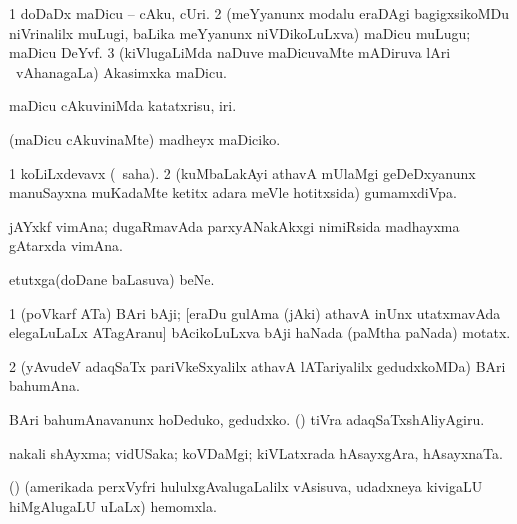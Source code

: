 \bentry
{}
\gl{\nA}
\bmng
\bnum
\num{1} doDaDx maDicu -- cAku, cUri.   
\num{2} (meYyanunx modalu eraDAgi bagigxsikoMDu niVrinalilx muLugi, baLika meYyanunx niVDikoLuLxva) maDicu muLugu; maDicu DeYvf. 
\num{3} (kiVlugaLiMda naDuve maDicuvaMte mADiruva lAri \mo\ vAhanagaLa) Akasimxka maDicu. 
\enum
\emng
\eentry

\bentry
{}
\gl{\sakirx}
\bmng
maDicu cAkuviniMda katatxrisu, iri. 
\emng

\noindent
\gl{\akirx}
\bmng
(maDicu cAkuvinaMte) madheyx maDiciko. 
\emng
\eentry

\bentry
{}
\gl{\nA}
\bmng
\bnum
\num{1} koLiLxdevavx (\rUpa\ saha). 
\num{2} (kuMbaLakAyi athavA mUlaMgi geDeDxyanunx manuSayxna muKadaMte ketitx adara meVle hotitxsida) gumamxdiVpa.   
\enum
\emng
\eentry

\bentry
{}
\gl{\nA}
\bmng
jAYxkf vimAna; dugaRmavAda parxyANakAkxgi nimiRsida madhayxma gAtarxda vimAna. 
\emng
\eentry

\bentry
{}
\gl{\nA}
\bmng
etutxga(doDane baLasuva) beNe. 
\emng
\eentry

\bentry
{}
\gl{\nA}
\bmng
\bnum
\num{1} (poVkarf ATa) BAri bAji; [eraDu gulAma (jAki) athavA inUnx utatxmavAda elegaLuLaLx ATagAranu] bAcikoLuLxva bAji haNada (paMtha paNada) motatx. 
\num{2} (yAvudeV adaqSaTx pariVkeSxyalilx athavA lATariyalilx gedudxkoMDa) BAri bahumAna. 
\enum
\emng

\noindent
\gl{\pagu}
\bmng
{} 
\banum
{} BAri bahumAnavanunx hoDeduko, gedudxko. 
 (\rUpa) tiVra adaqSaTxshAliyAgiru. 
\eanum
\emng
\eentry

\bentry
{}
\gl{\nA}
\bmng
nakali shAyxma; vidUSaka; koVDaMgi; kiVLatxrada hAsayxgAra, hAsayxnaTa. 
\emng
\eentry

\bentry
{}
\gl{\nA}
\bmng
(\ame) (amerikada perxVyfri hululxgAvalugaLalilx vAsisuva, udadxneya kivigaLU hiMgAlugaLU uLaLx) hemomxla.   
\emng
\eentry

